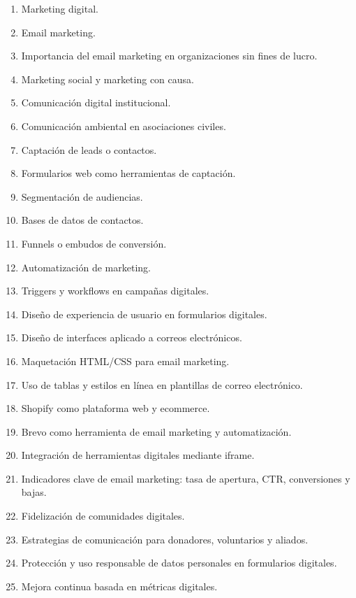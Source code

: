 \begin{enumerate}
    \item Marketing digital.
    \item Email marketing.
    \item Importancia del email marketing en organizaciones sin fines de lucro.
    \item Marketing social y marketing con causa.
    \item Comunicación digital institucional.
    \item Comunicación ambiental en asociaciones civiles.
    \item Captación de leads o contactos.
    \item Formularios web como herramientas de captación.
    \item Segmentación de audiencias.
    \item Bases de datos de contactos.
    \item Funnels o embudos de conversión.
    \item Automatización de marketing.
    \item Triggers y workflows en campañas digitales.
    \item Diseño de experiencia de usuario en formularios digitales.
    \item Diseño de interfaces aplicado a correos electrónicos.
    \item Maquetación HTML/CSS para email marketing.
    \item Uso de tablas y estilos en línea en plantillas de correo electrónico.
    \item Shopify como plataforma web y ecommerce.
    \item Brevo como herramienta de email marketing y automatización.
    \item Integración de herramientas digitales mediante iframe.
    \item Indicadores clave de email marketing: tasa de apertura, CTR, conversiones y bajas.
    \item Fidelización de comunidades digitales.
    \item Estrategias de comunicación para donadores, voluntarios y aliados.
    \item Protección y uso responsable de datos personales en formularios digitales.
    \item Mejora continua basada en métricas digitales.
\end{enumerate}